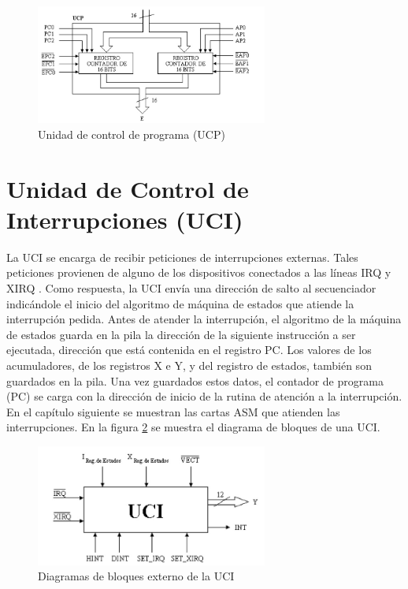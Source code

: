 \documentclass[12pt]{book}
\theoremstyle{definition}
\theoremstyle{remark}
\theoremstyle{plain}
\begin{document}
\begin{figure}
\centering
\includegraphics[width=3in]{UCP.jpg}
\caption{Unidad de control de programa (UCP)}
\label{fig37}
\end{figure}


\section{Unidad de Control de Interrupciones (UCI)}

La UCI se encarga de recibir peticiones de interrupciones externas. Tales peticiones provienen de
alguno de los dispositivos conectados a las líneas IRQ y XIRQ . Como respuesta, la UCI envía una
dirección de salto al secuenciador indicándole el inicio del algoritmo de máquina de estados que
atiende la interrupción pedida.
Antes de atender la interrupción, el algoritmo de la máquina de estados guarda en la pila la
dirección de la siguiente instrucción a ser ejecutada, dirección que está contenida en el registro PC.
Los valores de los acumuladores, de los registros X e Y, y del registro de estados, también son
guardados en la pila. Una vez guardados estos datos, el contador de programa (PC) se carga con la
dirección de inicio de la rutina de atención a la interrupción. En el capítulo siguiente se muestran las
cartas ASM que atienden las interrupciones. En la figura \ref{fig38} se muestra el diagrama de bloques de una UCI.



\begin{figure}
\centering
\includegraphics[width=3in]{UCI.jpg}
\caption{Diagramas de bloques externo de la UCI}
\label{fig38}
\end{figure}
\end{document}
